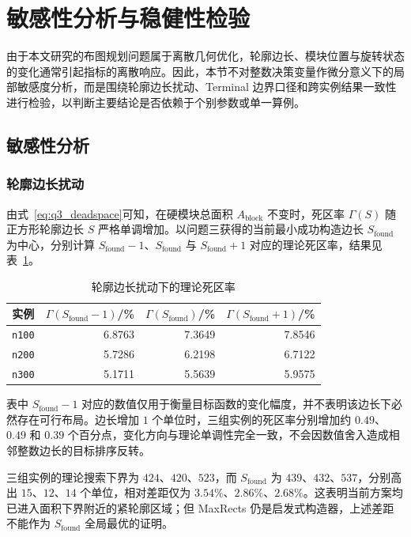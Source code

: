 \section{敏感性分析与稳健性检验}

由于本文研究的布图规划问题属于离散几何优化，轮廓边长、模块位置与旋转状态的变化通常引起指标的离散响应。因此，本节不对整数决策变量作微分意义下的局部敏感度分析，而是围绕轮廓边长扰动、Terminal 边界口径和跨实例结果一致性进行检验，以判断主要结论是否依赖于个别参数或单一算例。

\subsection{敏感性分析}

\subsubsection{轮廓边长扰动}

由式~\eqref{eq:q3_deadspace}可知，在硬模块总面积 $A_{\mathrm{block}}$ 不变时，死区率 $\Gamma(S)$ 随正方形轮廓边长 $S$ 严格单调增加。以问题三获得的当前最小成功构造边长 $S_{\mathrm{found}}$ 为中心，分别计算 $S_{\mathrm{found}}-1$、$S_{\mathrm{found}}$ 与 $S_{\mathrm{found}}+1$ 对应的理论死区率，结果见表~\ref{tab:sensitivity_side}。

\begin{table}[H]
  \centering
  \caption{轮廓边长扰动下的理论死区率}
  \label{tab:sensitivity_side}
  \small
  \renewcommand{\arraystretch}{1.15}
  \begin{tabular}{c r r r}
    \toprule
    实例 & $\Gamma(S_{\mathrm{found}}-1)$/\% & $\Gamma(S_{\mathrm{found}})$/\% & $\Gamma(S_{\mathrm{found}}+1)$/\% \\
    \midrule
    \texttt{n100} & 6.8763 & 7.3649 & 7.8546 \\
    \texttt{n200} & 5.7286 & 6.2198 & 6.7122 \\
    \texttt{n300} & 5.1711 & 5.5639 & 5.9575 \\
    \bottomrule
  \end{tabular}
\end{table}

表中 $S_{\mathrm{found}}-1$ 对应的数值仅用于衡量目标函数的变化幅度，并不表明该边长下必然存在可行布局。边长增加 $1$ 个单位时，三组实例的死区率分别增加约 $0.49$、$0.49$ 和 $0.39$ 个百分点，变化方向与理论单调性完全一致，不会因数值舍入造成相邻整数边长的目标排序反转。

三组实例的理论搜索下界为 $424$、$420$、$523$，而 $S_{\mathrm{found}}$ 为 $439$、$432$、$537$，分别高出 $15$、$12$、$14$ 个单位，相对差距仅为 $3.54\%$、$2.86\%$、$2.68\%$。这表明当前方案均已进入面积下界附近的紧轮廓区域；但 MaxRects 仍是启发式构造器，上述差距不能作为 $S_{\mathrm{found}}$ 全局最优的证明。


